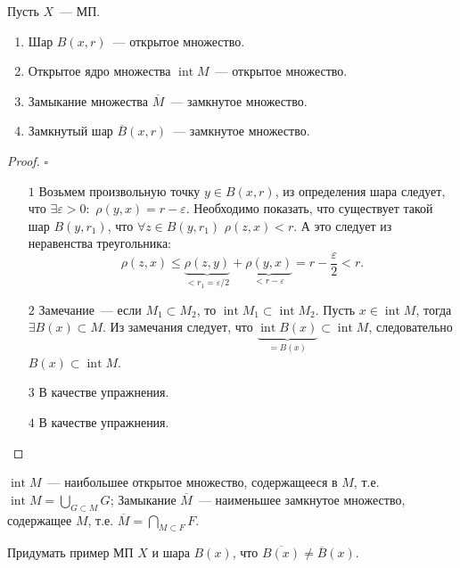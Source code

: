 \begin{theorem}
  Пусть $X$~--- МП.
  \begin{enumerate}
    \item Шар $B(x,r)$~--- открытое  множество.
    \item Открытое ядро множества $\operatorname{int}M$~--- открытое множество.
    \item Замыкание множества $\overline{M}$~--- замкнутое множество.
    \item Замкнутый шар $\overline{B}(x,r)$~--- замкнутое множество.
  \end{enumerate}
\end{theorem}
\begin{proof} \href{https://youtu.be/r2DT_f552TA?t=3450}{$\square$}
  
  \begin{enumerate}
    \item[$\boxed{1}$] Возьмем произвольную точку $y \in B(x,r)$, из определения шара следует, что $\exists \varepsilon > 0 : $ $ \rho(y,x) = r - \varepsilon$. Необходимо показать, что существует такой шар $B(y, r_1)$, что $\forall z \in B(y, r_1)$ $ \rho(z,x)<r$. А это следует из неравенства треугольника:
    \[\rho(z,x) \leqslant \underbrace{\rho(z,y)}_{<r_1 = \varepsilon/2} + \underbrace{\rho(y,x)}_{< r - \varepsilon} = r - \frac{\varepsilon}{2} < r.  \]

    \item[$\boxed{2}$] Замечание~---  если $M_1 \subset M_2$, то $\operatorname{int}M_1 \subset \operatorname{int}M_2$. Пусть $x \in \operatorname{int} M$, тогда $\exists B(x) \subset M$. Из замечания следует, что $\underbrace{\operatorname{int} B(x)}_{=B(x)} \subset \operatorname{int} M$, следовательно $B(x) \subset \operatorname{int}M$.
    \item[$\boxed{3}$] В качестве упражнения.
    \item[$\boxed{4}$] В качестве упражнения.  
  \end{enumerate}
\end{proof}
\begin{remark}
  $\operatorname{int}M$~--- наибольшее открытое  множество,  содержащееся в $M$, т.е. $\operatorname{int}M = \bigcup\limits_{G\subset M} G$; Замыкание $\overline{M}$~--- наименьшее замкнутое  множество, содержащее $M$, т.е. $\overline{M} = \bigcap\limits_{M \subset F} F$.
\end{remark}
\begin{exercise}
  Придумать пример МП $X$ и шара $B(x)$, что $\overline{B(x)} \neq \overline{B}(x)$.  
\end{exercise}



